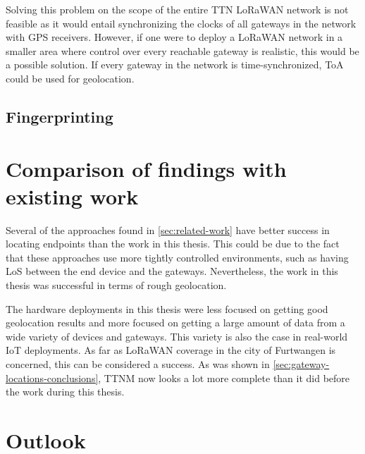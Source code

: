 Solving this problem on the scope of the entire \ac{TTN} \ac{LoRaWAN} network is not feasible as it would entail synchronizing the clocks of all gateways in the network with \ac{GPS} receivers.
However, if one were to deploy a \ac{LoRaWAN} network in a smaller area where control over every reachable gateway is realistic, this would be a possible solution.
If every gateway in the network is time-synchronized, \ac{ToA} could be used for geolocation.

\subsection{Fingerprinting}




\section{Comparison of findings with existing work}


Several of the approaches found in \cref{sec:related-work} have better success in locating endpoints than the work in this thesis.
This could be due to the fact that these approaches use more tightly controlled environments, such as having \ac{LoS} between the end device and the gateways.
Nevertheless, the work in this thesis was successful in terms of rough geolocation.

The hardware deployments in this thesis were less focused on getting good geolocation results and more focused on getting a large amount of data from a wide variety of devices and gateways.
This variety is also the case in real-world \ac{IoT} deployments.
As far as \ac{LoRaWAN} coverage in the city of Furtwangen is concerned, this can be considered a success.
As was shown in \cref{sec:gateway-locations-conclusions}, \ac{TTNM} now looks a lot more complete than it did before the work during this thesis.

\section{Outlook}

